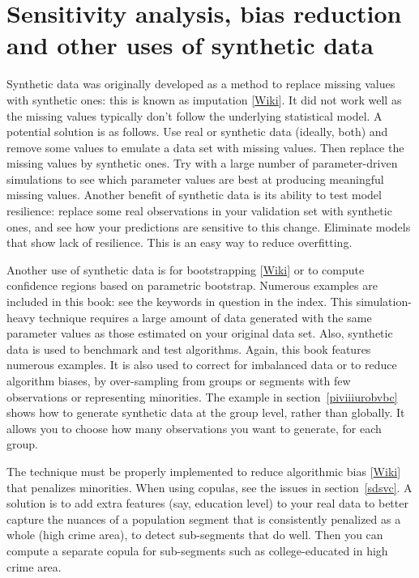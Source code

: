 \documentclass[oneside,10pt]{book}
\begin{document}
\section{Sensitivity analysis, bias reduction and other uses of synthetic data}

\textcolor{index}{Synthetic data} was originally developed as a method to replace missing values with synthetic ones: this is known 
as \textcolor{index}{imputation} [\href{https://en.wikipedia.org/wiki/Imputation_(statistics)}{Wiki}]. 
It did not work well as the missing values typically don't follow the underlying statistical model. A potential solution is as follows. 
Use real or synthetic data (ideally, both) and remove some values to emulate a data set with missing values. Then replace the missing values by synthetic ones. Try with a large number of parameter-driven simulations to see which parameter values are best at producing meaningful missing values. Another benefit of synthetic data is its ability to test model resilience: replace some real observations in your 
\textcolor{index}{validation set} with 
 synthetic ones, and see how your predictions are sensitive to this change. Eliminate models that show lack of resilience. This is an easy way to reduce \textcolor{index}{overfitting}.  

Another use of synthetic data is for \textcolor{index}{bootstrapping} [\href{https://en.wikipedia.org/wiki/Bootstrapping_(statistics)}{Wiki}] or to compute \textcolor{index}{confidence regions} based on 
\textcolor{index}{parametric bootstrap}. Numerous examples are included in this book: see the keywords in question in the index. This simulation-heavy technique requires a large amount of
 data generated with the same parameter values as those estimated on your original data set. Also, synthetic data is used to benchmark and test 
 algorithms. Again, this book features numerous examples. It is also used to correct for imbalanced data or to reduce algorithm biases, by over-sampling from groups or segments with few observations or representing minorities. The example in section~\ref{piviiiurobvbc} shows
 how to generate synthetic data at the group level, rather than globally. It allows you to choose how many observations you want to generate, for each group.

The technique must be properly implemented to reduce \textcolor{index}{algorithmic bias} [\href{https://en.wikipedia.org/wiki/Algorithmic_bias}{Wiki}] that penalizes minorities. When using copulas, see the issues in section~\ref{sdsvc}. A solution  is to add extra features (say, education level) to your real data to better capture the nuances of a population segment that is consistently penalized as a whole (high crime area), to detect sub-segments that do well. Then you can compute a separate copula for sub-segments such as college-educated in high crime area. 
\end{document}
